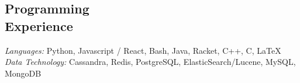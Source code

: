 \documentclass[margin,line]{resume}
\begin{document}
\begin{resume}
    \section{\mysidestyle Programming\\Experience}

    \emph{Languages:} Python, Javascript / React, Bash, Java, Racket, C++, C, \LaTeX \\
    \emph{Data Technology:} Cassandra, Redis, PostgreSQL, ElasticSearch/Lucene, MySQL, MongoDB
\end{resume}
\end{document}
